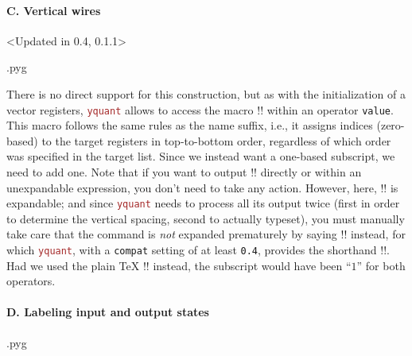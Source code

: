 \documentclass{scrartcl}
\makeatletter
\newenvironment{codeexample}{%
   \VerbatimEnvironment%
   \let\FVB@VerbatimOut\minted@FVB@VerbatimOut
   \let\FVE@VerbatimOut\minted@FVE@VerbatimOut
   \minted@configlang{tex}%
   \minted@fvset
   \begin{VerbatimOut}[codes={\catcode`\^^I=12},firstline,lastline]{\minted@jobname.pyg}%
}{
   \end{VerbatimOut}%
   \minted@langlinenoson%
   \savebox\codeexamplebox{ \minted@jobname.pyg}%
   \ifdim\wd\codeexamplebox>\dimexpr.5\linewidth-3mm\relax%
      \wd\codeexamplebox=.5\linewidth%
   \else%
      \wd\codeexamplebox=\dimexpr\wd\codeexamplebox+3mm\relax%
   \fi%
   \noindent\begin{minipage}{\wd\codeexamplebox}%
      \centering%
      \usebox\codeexamplebox%
   \end{minipage}%
   \begin{minipage}{\dimexpr\linewidth-\wd\codeexamplebox\relax}%
      \minted@pygmentize{\minted@lang}%
   \end{minipage}%
   \minted@langlinenosoff%
   \par%
}
\def\pkg#1{\textcolor{brown}{\texttt{#1}}}
\def\Yquant{\pkg{yquant}}
\makeatother
\begin{document}
            \paragraph{C. Vertical wires}\leavevmode
               \begin{example}<Updated in 0.4, 0.1.1>
                  \begin{codeexample}
                  \end{codeexample}
                  There is no direct support for this construction, but as with the initialization of a vector registers, \Yquant{} allows to access the macro \tex!\idx! within an operator \texttt{value}.
                  This macro follows the same rules as the name suffix, i.e., it assigns indices (zero\hyp based) to the target registers in top\hyp to\hyp bottom order, regardless of which order was specified in the target list.
                  Since we instead want a one\hyp based subscript, we need to add one.
                  Note that if you want to output \tex!\idx! directly or within an unexpandable expression, you don't need to take any action.
                  However, here, \tex!\the! is expandable; and since \Yquant{} needs to process all its output twice (first in order to determine the vertical spacing, second to actually typeset), you must manually take care that the command is \emph{not} expanded prematurely by saying \tex!\protect\the! instead, for which \Yquant{}, with a \texttt{compat} setting of at least \texttt{0.4}, provides the shorthand \tex!\The!.
                  Had we used the plain \TeX{} \tex!\the! instead, the subscript would have been ``$1$'' for both operators.
               \end{example}

            \paragraph{D. Labeling input and output states}\leavevmode
               \begin{example}
                  \begin{codeexample}
                  \end{codeexample}
               \end{example}
\end{document}

